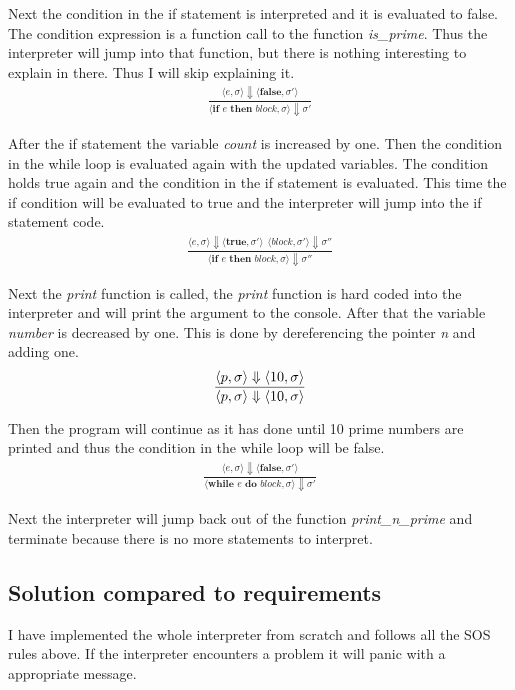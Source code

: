 \documentclass[12pt]{article}
\begin{document}
	Next the condition in the if statement is interpreted and it is evaluated to false. The condition expression is a function call to the function \emph{is\_prime}. Thus the interpreter will jump into that function, but there is nothing interesting to explain in there. Thus I will skip explaining it.
	\begin{align*}
		\frac{\langle e, \sigma \rangle\Downarrow \langle \textbf{false}, \sigma' \rangle}
		{\langle \textbf{if } e \textbf{ then } block, \sigma \rangle\Downarrow \sigma'}
	\end{align*}

	After the if statement the variable \emph{count} is increased by one. Then the condition in the while loop is evaluated again with the updated variables. The condition holds true again and the condition in the if statement is evaluated. This time the if condition will be evaluated to true and the interpreter will jump into the if statement code.
	\begin{align*}
		\frac{\langle e, \sigma \rangle\Downarrow \langle \textbf{true}, \sigma' \rangle \ \
		\langle block, \sigma' \rangle\Downarrow \sigma''}
		{\langle \textbf{if } e \textbf{ then } block, \sigma \rangle\Downarrow \sigma''}
	\end{align*}

	Next the \emph{print} function is called, the \emph{print} function is hard coded into the interpreter and will print the argument to the console. After that the variable \emph{number} is decreased by one. This is done by dereferencing the pointer \emph{n} and adding one.
	\begin{align*}
		\frac{\langle \*p, \sigma \rangle\Downarrow \langle 10, \sigma \rangle}
		{\langle \*p, \sigma \rangle\Downarrow \langle 10, \sigma \rangle}
	\end{align*}
	
	Then the program will continue as it has done until 10 prime numbers are printed and thus the condition in the while loop will be false.
	\begin{align*}
		\frac{\langle e, \sigma \rangle\Downarrow \langle \textbf{false}, \sigma' \rangle}
		{\langle \textbf{while } e \textbf{ do } block, \sigma \rangle\Downarrow \sigma'}
	\end{align*}

	Next the interpreter will jump back out of the function \emph{print\_n\_prime} and terminate because there is no more statements to interpret.



    \subsection{Solution compared to requirements}
	I have implemented the whole interpreter from scratch and follows all the SOS rules above. If the interpreter encounters a problem it will panic with a appropriate message. 
\end{document}
